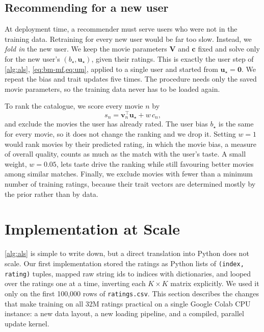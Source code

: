 \documentclass{article}
\theoremstyle{plain}
\theoremstyle{definition}
\theoremstyle{remark}
\begin{document}
\subsection{Recommending for a new user}
\label{sec:foldin}

At deployment time, a recommender must serve users who were not in the
training data. Retraining for every new user would be far too slow.
Instead, we \emph{fold in} the new user. We keep the movie parameters
$\mathbf{V}$ and $\mathbf{c}$ fixed and solve only for the new user's
$(b_\star, \mathbf{u}_\star)$, given their ratings. This is exactly the user
step of \cref{alg:als}, \cref{eq:bm-mf,eq:um}, applied to a single user and
started from $\mathbf{u}_\star = \mathbf{0}$. We repeat the bias and trait
updates five times. The procedure needs only the saved movie parameters,
so the training data never has to be loaded again.

To rank the catalogue, we score every movie $n$ by
\begin{equation}
  s_n = \mathbf{v}_n^\top \mathbf{u}_\star + w \, c_n ,
  \label{eq:score}
\end{equation}
and exclude the movies the user has already rated. The user bias $b_\star$
is the same for every movie, so it does not change the ranking and we drop
it. Setting $w = 1$ would rank movies by their predicted rating, in which
the movie bias, a measure of overall quality, counts as much as the match
with the user's taste. A small weight, $w = 0.05$, lets taste drive the
ranking while still favouring better movies among similar matches. Finally,
we exclude movies with fewer than a minimum number of training ratings,
because their trait vectors are determined mostly by the prior rather than
by data.

\section{Implementation at Scale}
\label{sec:implementation}

\cref{alg:als} is simple to write down, but a direct translation into
Python does not scale. Our first implementation stored the ratings as
Python lists of \texttt{(index, rating)} tuples, mapped raw string ids to
indices with dictionaries, and looped over the ratings one at a time,
inverting each $K \times K$ matrix explicitly. We used it only on the first
100{,}000 rows of \texttt{ratings.csv}. This section describes the changes
that make training on all 32M ratings practical on a single Google Colab
CPU instance: a new data layout, a new loading pipeline, and a compiled,
parallel update kernel.
\end{document}
